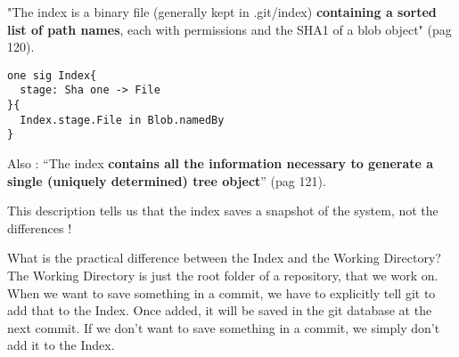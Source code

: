 "The index is a binary file (generally kept in .git/index) 
{\bf containing a sorted list of path names}, each with permissions and the
SHA1 of a blob object" \cite{gitComm} (pag 120). \par 

\begin{lstlisting}
one sig Index{	
  stage: Sha one -> File
}{
  Index.stage.File in Blob.namedBy
}
\end{lstlisting}

Also : ``The index {\bf contains all the information necessary to generate a single
(uniquely determined) tree object}'' \cite{gitComm} (pag 121). \par
This description tells us that the index saves a snapshot of the system,
not the differences !

What is the practical difference between the Index and the Working
Directory? The Working Directory is just the root folder of a repository,
that we work on. When we want to save something in a commit, we have to explicitly 
tell git to add that to the Index. Once added, it
will be saved in the git database at the next commit. If we don't want to save
something in a commit, we simply don't add it to the Index.



%
%
%
%
